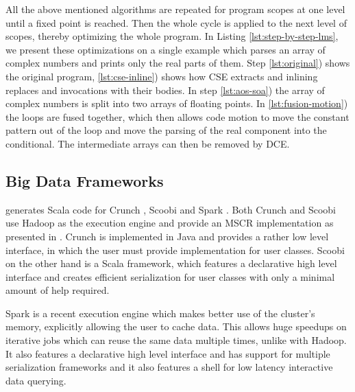 All the above mentioned algorithms are repeated for program scopes at one level until a fixed point is reached. Then the whole cycle is applied to the next level of scopes, thereby optimizing the whole program. In Listing \ref{lst:step-by-step-lms}, we present these optimizations on a single example which parses an array of complex numbers and prints only the real parts of them. Step \ref{lst:original}) shows the original program, \ref{lst:cse-inline}) shows how CSE extracts  and inlining replaces  and  invocations with their bodies. In step \ref{lst:aos-soa}) the array  of complex numbers is split into two arrays of floating points. 
In \ref{lst:fusion-motion}) the loops are fused together, which then allows code motion to move the constant pattern out of the loop and move the parsing of the real component into the conditional. The intermediate arrays can then be removed by DCE.

\subsection{Big Data Frameworks}
\label{subsed:big-data-frameworks}
\tool generates Scala code for Crunch \cite{crunch}, Scoobi \cite{scoobi} and Spark \cite{spark-nsdi}. Both Crunch and Scoobi use Hadoop as the execution engine and provide an MSCR implementation as presented in \cite{chambers_flumejava:_2010}. Crunch is implemented in Java and provides a rather low level interface, in which the user must provide implementation for user classes. Scoobi on the other hand is a Scala framework, which features a declarative high level interface and creates efficient serialization for user classes with only a minimal amount of help required. 

Spark is a recent execution engine which makes better use of the cluster's memory, explicitly allowing the user to cache data. This allows huge speedups on iterative jobs which can reuse the same data multiple times, unlike with Hadoop. It also features a declarative high level interface and has support for multiple serialization frameworks and it also features a shell for low latency interactive data querying.